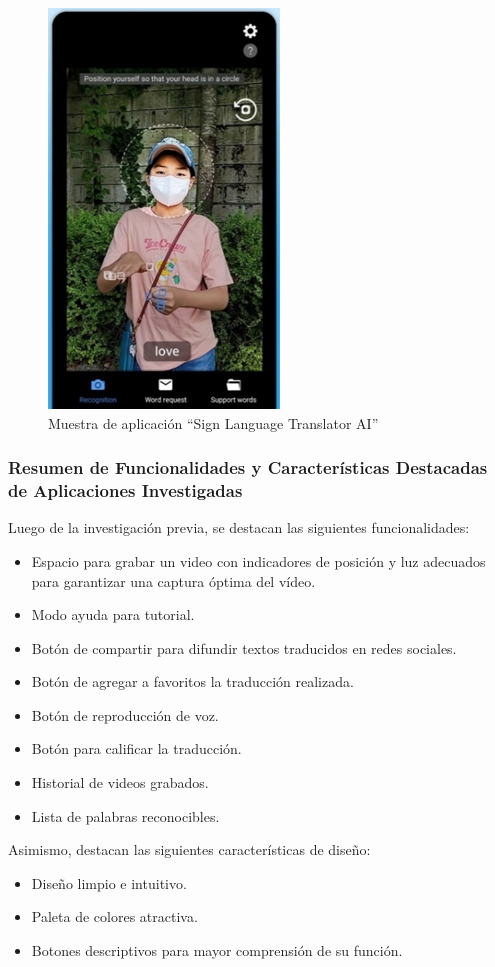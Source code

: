 \begin{figure} [H]
    \centering
    \includegraphics[width=0.25\linewidth]{figuras/ai_sign_lenguaje.png}
    \caption{Muestra de aplicación “Sign Language Translator AI”}
    \label{fig:enter-label}
\end{figure}

\subsubsection{Resumen de Funcionalidades y Características Destacadas de Aplicaciones Investigadas}

Luego de la investigación previa, se destacan las siguientes funcionalidades:
\begin{itemize}
    \item Espacio para grabar un video con indicadores de posición y luz adecuados para garantizar una captura óptima del vídeo.
    \item Modo ayuda para tutorial.
    \item Botón de compartir para difundir textos traducidos en redes sociales.
    \item Botón de agregar a favoritos la traducción realizada.
    \item Botón de reproducción de voz.
    \item Botón para calificar la traducción.
    \item Historial de videos grabados.
    \item Lista de palabras reconocibles.
\end{itemize}

Asimismo, destacan las siguientes características de diseño:
\begin{itemize}
    \item Diseño limpio e intuitivo.
    \item Paleta de colores atractiva.
    \item Botones descriptivos para mayor comprensión de su función.
\end{itemize}

